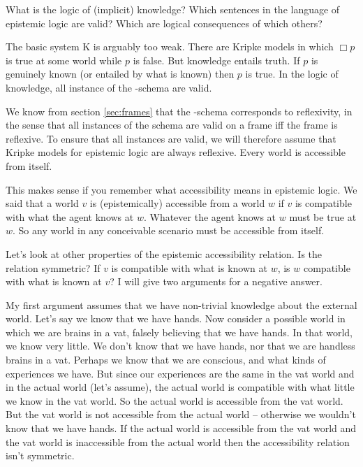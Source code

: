What is the logic of (implicit) knowledge? Which sentences in the language of
epistemic logic are valid? Which are logical consequences of which others?

The basic system K is arguably too weak. There are Kripke models in which
$\Box p$ is true at some world while $p$ is false. But knowledge entails truth.
If $p$ is genuinely known (or entailed by what is known) then $p$ is true. In
the logic of knowledge, all instance of the -schema are valid.
%

We know from section \ref{sec:frames} that the -schema corresponds to
reflexivity, in the sense that all instances of the schema are valid on a frame
iff the frame is reflexive. To ensure that all  instances are valid, we
will therefore assume that Kripke models for epistemic logic are always reflexive.
Every world is accessible from itself.

This makes sense if you remember what accessibility means in epistemic logic. We
said that a world $v$ is (epistemically) accessible from a world $w$ if $v$ is
compatible with what the agent knows at $w$. Whatever the agent knows at $w$
must be true at $w$. So any world in any conceivable scenario must be
accessible from itself.


Let's look at other properties of the epistemic accessibility relation. Is the
relation symmetric? If $v$ is compatible with what is known at $w$, is $w$
compatible with what is known at $v$? I will give two arguments for a negative
answer.

My first argument assumes that we have non-trivial knowledge about the external
world. Let's say we know that we have hands. Now consider a possible world in
which we are brains in a vat, falsely believing that we have hands. In that
world, we know very little. We don't know that we have hands, nor that we are
handless brains in a vat. Perhaps we know that we are conscious, and what kinds
of experiences we have. But since our experiences are the same in the vat world
and in the actual world (let's assume), the actual world is compatible with what
little we know in the vat world. So the actual world is accessible from the vat
world. But the vat world is not accessible from the actual world -- otherwise we
wouldn't know that we have hands. If the actual world is accessible from the vat
world and the vat world is inaccessible from the actual world then the
accessibility relation isn't symmetric.

